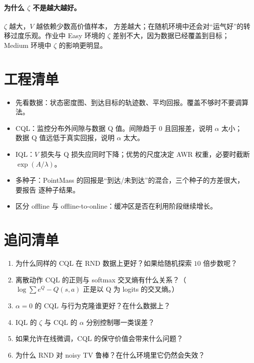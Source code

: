 \documentclass[10pt,twocolumn,a4paper]{ctexart}
\begin{document}
\paragraph{为什么 $\zeta$ 不是越大越好。}$\zeta$ 越大，$V$ 越依赖少数高价值样本，
方差越大；在随机环境中还会对“运气好”的转移过度乐观。作业中 Easy 环境的
$\zeta$ 差别不大，因为数据已经覆盖到目标；Medium 环境中 $\zeta$ 的影响更明显。

\section{工程清单}
\begin{itemize}
\item 先看数据：状态密度图、到达目标的轨迹数、平均回报。覆盖不够时不要调算法。
\item CQL：监控分布外间隙与数据 Q 值。间隙趋于 $0$ 且回报差，说明 $\alpha$ 太小；
数据 Q 值远低于真实回报，说明 $\alpha$ 太大。
\item IQL：$V$ 损失与 Q 损失应同时下降；优势的尺度决定 AWR 权重，必要时截断
$\exp(A/\lambda)$。
\item 多种子：PointMass 的回报是“到达/未到达”的混合，三个种子的方差很大，要报告
逐种子结果\citep{agarwal2021precipice}。
\item 区分 offline 与 offline-to-online：缓冲区是否在利用阶段继续增长。
\end{itemize}

\section{追问清单}
\begin{enumerate}
\item 为什么同样的 CQL 在 RND 数据上更好？如果给随机探索 $10$ 倍步数呢？
\item 离散动作 CQL 的正则与 softmax 交叉熵有什么关系？（$\log\sum e^{Q}-Q(s,a)$
正是以 Q 为 logits 的交叉熵。）
\item $\alpha=0$ 的 CQL 与行为克隆谁更好？在什么数据上？
\item IQL 的 $\zeta$ 与 CQL 的 $\alpha$ 分别控制哪一类误差？
\item 如果允许在线微调，CQL 的保守价值会带来什么问题？\citep{nakamoto2023calql}
\item 为什么 RND 对 noisy TV 鲁棒？在什么环境里它仍然会失效？
\end{enumerate}



\end{document}
